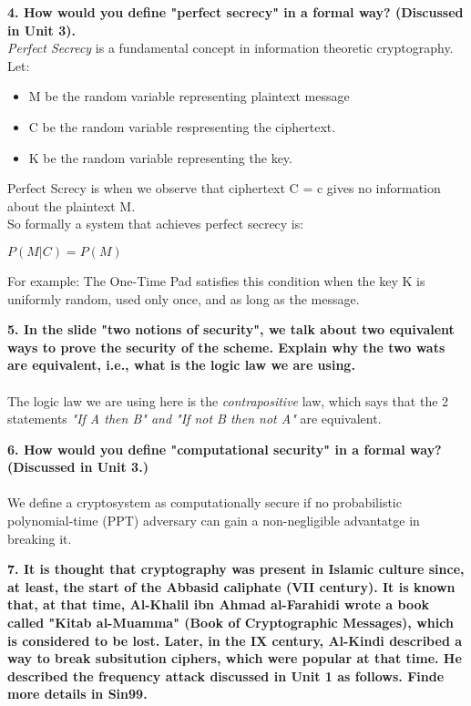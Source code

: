 \documentclass[]{article}
\numberwithin{figure}{section}
\begin{document}
\noindent \textbf{4. How would you define "perfect secrecy" in a formal way? (Discussed in Unit 3).} \\
\textit{Perfect Secrecy} is a fundamental concept in information theoretic cryptography. \\
Let:
\begin{itemize}
	\item M be the random variable representing plaintext message
	\item C be the random variable respresenting the ciphertext.
	\item K be the random variable representing the key.
\end{itemize} 
Perfect Screcy is when we observe that ciphertext C = c gives no information about the plaintext M.\\
So formally a system that achieves perfect secrecy is:
\begin{center}
	$P(M | C) = P(M)$
\end{center}
For example: The One-Time Pad satisfies this condition when the key K is uniformly random, used only once, and as long as the message.

\bigskip 
\noindent
\textbf{5. In the slide "two notions of security", we talk about two equivalent ways to prove the security of the scheme. Explain why the two wats are equivalent, i.e., what is the logic law we are using.} \\ \\
The logic law we are using here is the \textit{contrapositive} law, which says that the 2 statements \textit{"If A then B" and "If not B then not A"} are equivalent.

\bigskip

\noindent \textbf{6. How would you define "computational security" in a formal way? (Discussed in Unit 3.)} \\ \\
We define a cryptosystem as computationally secure if no probabilistic polynomial-time (PPT) adversary can gain a non-negligible advantatge in breaking it.

\newpage
\bigskip
\noindent
\textbf{7. It is thought that cryptography was present in Islamic culture since, at least, the start of the Abbasid caliphate (VII century). It is known that, at that time, Al-Khalil ibn Ahmad al-Farahidi wrote a book called "Kitab al-Muamma" (Book of Cryptographic Messages), which is considered to be lost. Later, in the IX century, Al-Kindi described a way to break subsitution ciphers, which were popular at that time. He described the frequency attack discussed in Unit 1 as follows. Finde more details in Sin99.} 
\end{document}
